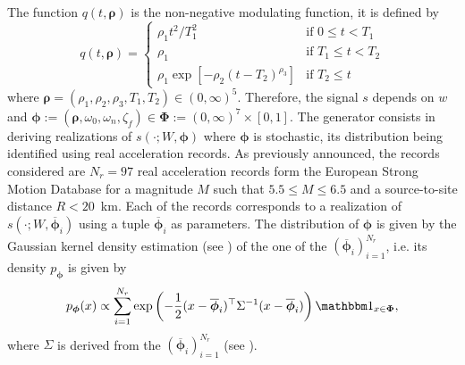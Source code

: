  The function $q(t,\boldsymbol\rho)$ is the non-negative modulating function, it is defined by
    \begin{equation}
        q(t,\boldsymbol\rho) = \left\lbrace \begin{array}{ll}
            \rho_1t^2/T_1^2 & \text{if\ } 0\leq t< T_1 \\
            \rho_1 & \text{if\ }T_1\leq t< T_2\\
            \rho_1\exp\left[-\rho_2(t-T_2)^{\rho_3}\right] &\text{if\ }T_2\leq t
        \end{array}\right.
    \end{equation}
where $\boldsymbol\rho=(\rho_1,\rho_2,\rho_3,T_1,T_2)\in(0,\infty)^5$.
Therefore, the signal $s$ depends on $w$ and 
$\boldsymbol{\phi}:=(\boldsymbol{\rho},\omega_0,\omega_n,\zeta_f)\in\boldsymbol{\Phi}:=(0,\infty)^7\times[0,1]$.
The generator consists in deriving realizations of $s(\cdot;W,\boldsymbol\phi)$ where 
$\boldsymbol{\phi}$
is stochastic,
its distribution being identified using real acceleration records.
As previously announced,
the records considered are $N_r=97$ real acceleration records form the European Strong Motion Database for a magnitude $M$ such that $5.5\leq M\leq 6.5$ and a source-to-site distance $R<20$~km.
Each of the records corresponds to a realization of $s(\cdot;W,\overline{\boldsymbol{\phi}}_i)$ using a tuple $\overline{\boldsymbol\phi}_i$ as parameters. The distribution of $\boldsymbol{\phi}$ is given by the Gaussian kernel density estimation (see \cite{kristan_multivariate_2011}) of the one of the $(\overline{\boldsymbol\phi}_i)_{i=1}^{N_r}$, i.e. its density $p_{\boldsymbol{\phi}}$ is given by
    \begin{equation}
        p_{\boldsymbol{\phi}}(x) \propto \sum_{i=1}^{N_r}\exp\left( -\frac{1}{2} (x-\overline{\boldsymbol\phi}_i)^\top\Sigma^{-1}(x-\overline{\boldsymbol\phi}_i) \right)\indic_{x\in\boldsymbol{\Phi}},
    \end{equation}
where $\Sigma$ is derived from the $(\overline{\boldsymbol{\phi}}_i)_{i=1}^{N_r}$ (see \cite{kristan_multivariate_2011}).


